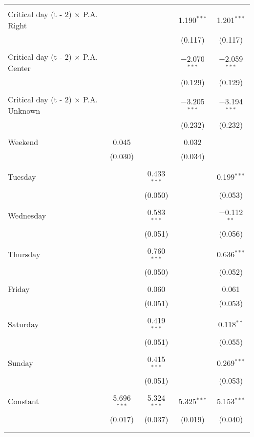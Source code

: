 \documentclass[
]{article}
\begin{document}
\begin{table}[!htbp]
{\begin{tabular}{@{\extracolsep{5pt}}lcccc}
  & & & & \\ 
 Critical day (t - 2) $\times$ P.A. Right &  &  & 1.190$^{***}$ & 1.201$^{***}$ \\ 
  &  &  & (0.117) & (0.117) \\ 
  & & & & \\ 
 Critical day (t - 2) $\times$ P.A. Center &  &  & $-$2.070$^{***}$ & $-$2.059$^{***}$ \\ 
  &  &  & (0.129) & (0.129) \\ 
  & & & & \\ 
 Critical day (t - 2) $\times$ P.A. Unknown &  &  & $-$3.205$^{***}$ & $-$3.194$^{***}$ \\ 
  &  &  & (0.232) & (0.232) \\ 
  & & & & \\ 
 Weekend & 0.045 &  & 0.032 &  \\ 
  & (0.030) &  & (0.034) &  \\ 
  & & & & \\ 
 Tuesday &  & 0.433$^{***}$ &  & 0.199$^{***}$ \\ 
  &  & (0.050) &  & (0.053) \\ 
  & & & & \\ 
 Wednesday &  & 0.583$^{***}$ &  & $-$0.112$^{**}$ \\ 
  &  & (0.051) &  & (0.056) \\ 
  & & & & \\ 
 Thursday &  & 0.760$^{***}$ &  & 0.636$^{***}$ \\ 
  &  & (0.050) &  & (0.052) \\ 
  & & & & \\ 
 Friday &  & 0.060 &  & 0.061 \\ 
  &  & (0.051) &  & (0.053) \\ 
  & & & & \\ 
 Saturday &  & 0.419$^{***}$ &  & 0.118$^{**}$ \\ 
  &  & (0.051) &  & (0.055) \\ 
  & & & & \\ 
 Sunday &  & 0.415$^{***}$ &  & 0.269$^{***}$ \\ 
  &  & (0.051) &  & (0.053) \\ 
  & & & & \\ 
 Constant & 5.696$^{***}$ & 5.324$^{***}$ & 5.325$^{***}$ & 5.153$^{***}$ \\ 
  & (0.017) & (0.037) & (0.019) & (0.040) \\ 
  & & & & \\ 
\hline \\[-1.8ex] 

\end{tabular}}
\end{table}
\end{document}
